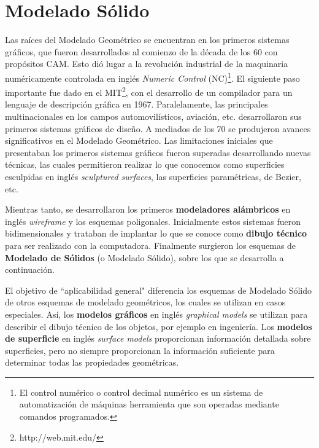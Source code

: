 \section{Modelado Sólido}
Las raíces del Modelado Geométrico se encuentran en los primeros sistemas gráficos, que fueron desarrollados al comienzo de la década de los 60 con propósitos CAM. Esto dió lugar a la revolución industrial de la maquinaria numéricamente controlada en inglés \textit{Numeric Control} (NC)\footnote{El control numérico o control decimal numérico es un sistema de automatización de máquinas herramienta que son operadas mediante comandos programados.}.
El siguiente paso importante fue dado en el MIT\footnote{http://web.mit.edu/}, con el desarrollo de un compilador para un lenguaje de descripción gráfica en 1967. Paralelamente, las principales multinacionales en los campos automovilísticos, aviación, etc. desarrollaron sus primeros sistemas gráficos de diseño.
A mediados de los 70 se produjeron avances significativos en el Modelado Geométrico. Las limitaciones iniciales que presentaban los primeros sistemas gráficos fueron superadas desarrollando nuevas técnicas, las cuales permitieron realizar lo que conocemos como superficies esculpidas en inglés \textit{sculptured surfaces}, las superficies paramétricas, de Bezier, etc.

Mientras tanto, se desarrollaron los primeros \textbf{modeladores alámbricos} en inglés \textit{wireframe} y los esquemas poligonales. Inicialmente estos sistemas fueron bidimensionales y trataban de implantar lo que se conoce como \textbf{dibujo técnico} para ser realizado con la computadora.
Finalmente surgieron los esquemas de \textbf{Modelado de Sólidos} (o Modelado Sólido), sobre los que se desarrolla a continuación.
 \citep{Ramos2011} 

El objetivo de ``aplicabilidad general" diferencia los esquemas de Modelado Sólido de otros esquemas de modelado geométricos, los cuales se utilizan en casos especiales. Así, los \textbf{modelos gráficos} en inglés \textit{graphical models} se utilizan para describir el dibujo técnico de los objetos, por ejemplo en ingeniería.
Los \textbf{modelos de superficie} en inglés \textit{surface models} proporcionan información detallada sobre superficies, pero no siempre proporcionan la información suficiente para determinar todas las propiedades geométricas. 

